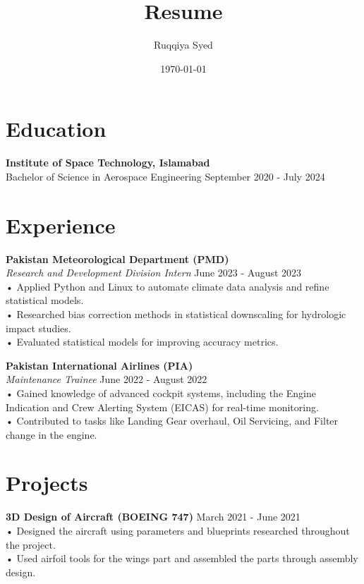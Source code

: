 \documentclass[a4paper,10pt]{article}
\begin{document}

\title{Resume}
\author{Ruqqiya Syed}
\date{\today}

\maketitle %

\section*{Education}
\noindent
\textbf{Institute of Space Technology, Islamabad} \\
Bachelor of Science in Aerospace Engineering \hfill September 2020 - July 2024

\section*{Experience}

\noindent
\textbf{Pakistan Meteorological Department (PMD)} \\
\textit{Research and Development Division Intern} \hfill June 2023 - August 2023 \\
• Applied Python and Linux to automate climate data analysis and refine statistical models. \\
• Researched bias correction methods in statistical downscaling for hydrologic impact studies. \\
• Evaluated statistical models for improving accuracy metrics.

\noindent
\textbf{Pakistan International Airlines (PIA)} \\
\textit{Maintenance Trainee} \hfill June 2022 - August 2022 \\
• Gained knowledge of advanced cockpit systems, including the Engine Indication and Crew Alerting System (EICAS) for real-time monitoring. \\
• Contributed to tasks like Landing Gear overhaul, Oil Servicing, and Filter change in the engine.

\section*{Projects}

\noindent
\textbf{3D Design of Aircraft (BOEING 747)} \hfill March 2021 - June 2021 \\
• Designed the aircraft using parameters and blueprints researched throughout the project. \\
• Used airfoil tools for the wings part and assembled the parts through assembly design.
\end{document}
